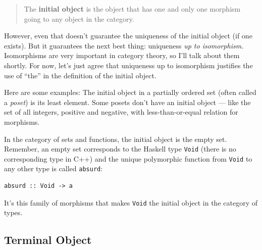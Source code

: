 \begin{quote}
The \textbf{initial object} is the object that has one and only one
morphism going to any object in the category.
\end{quote}

\begin{figure}
  \centering
\end{figure}

However, even that doesn't guarantee the uniqueness of the initial
object (if one exists). But it guarantees the next best thing:
uniqueness \emph{up to isomorphism}. Isomorphisms are very important in
category theory, so I'll talk about them shortly. For now, let's just
agree that uniqueness up to isomorphism justifies the use of ``the'' in
the definition of the initial object.

Here are some examples: The initial object in a partially ordered set
(often called a \emph{poset}) is its least element. Some posets don't
have an initial object --- like the set of all integers, positive and
negative, with less-than-or-equal relation for morphisms.

In the category of sets and functions, the initial object is the empty
set. Remember, an empty set corresponds to the Haskell type
\texttt{Void} (there is no corresponding type in C++) and the unique
polymorphic function from \texttt{Void} to any other type is called
\texttt{absurd}:

\begin{verbatim}
absurd :: Void -> a
\end{verbatim}

It's this family of morphisms that makes \texttt{Void} the initial
object in the category of types.

\subsection{Terminal Object}\label{terminal-object}

